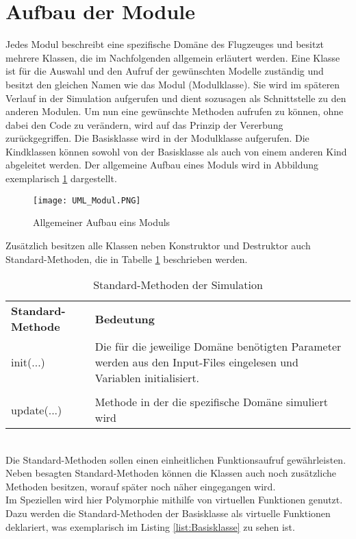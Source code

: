 \section{Aufbau der Module}
\label{sec:AufbauModule}
Jedes Modul beschreibt eine spezifische Domäne des Flugzeuges und  besitzt mehrere Klassen, die im Nachfolgenden allgemein erläutert werden. Eine Klasse ist für die Auswahl und den Aufruf der gewünschten Modelle zuständig und besitzt den gleichen Namen wie das Modul (Modulklasse). Sie wird im späteren Verlauf in der Simulation aufgerufen und dient sozusagen als Schnittstelle zu den anderen Modulen. Um nun eine gewünschte Methoden aufrufen zu können, ohne dabei den Code zu verändern, wird auf das Prinzip der Vererbung  zurückgegriffen. Die Basisklasse wird in der Modulklasse aufgerufen. Die Kindklassen können sowohl von der Basisklasse als auch von einem anderen Kind abgeleitet werden. Der allgemeine Aufbau eines Moduls wird in Abbildung exemplarisch \ref{fig:UML_Modul} dargestellt.
 \begin{figure}[h]
 	 \centering\texttt{[image: UML\_Modul.PNG]}
 	 \caption{Allgemeiner Aufbau eins Moduls }
 	 \label{fig:UML_Modul}
 \end{figure} \newpage
Zusätzlich besitzen alle Klassen neben Konstruktor und Destruktor auch Standard-Methoden, die in Tabelle \ref{tab:Standardmethoden} beschrieben werden.
\begin{table}[h]
	\centering	\begin{tabular}{l p{10cm}}
		\textbf{Standard-Methode} & \textbf{Bedeutung}\\
		init(...) & Die für die jeweilige Domäne benötigten Parameter werden aus den Input-Files eingelesen und Variablen initialisiert.\\\\
		update(...) & Methode in der die spezifische Domäne  simuliert wird	\end{tabular}
	\caption{Standard-Methoden der Simulation}
	\label{tab:Standardmethoden}
\end{table}\\
Die Standard-Methoden sollen einen einheitlichen Funktionsaufruf gewährleisten. Neben besagten Standard-Methoden können die Klassen auch noch zusätzliche Methoden besitzen, worauf später noch näher eingegangen wird. \\
Im Speziellen wird hier Polymorphie mithilfe von virtuellen Funktionen genutzt. Dazu werden die Standard-Methoden der Basisklasse als virtuelle Funktionen deklariert, was exemplarisch im Listing \ref{list:Basisklasse} zu sehen ist.\newpage

